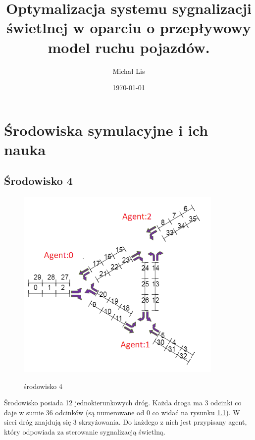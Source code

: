 \documentclass[12pt]{book}
\theoremstyle{plain}
\begin{document}
	\title{Optymalizacja  systemu sygnalizacji świetlnej w 
		oparciu o przepływowy model ruchu pojazdów.}
	\author{Michał Lis}
	\date{\today}
	\maketitle
	\tableofcontents
	
	\chapter {Środowiska symulacyjne i ich nauka}
	\section{Środowisko 4}
	\begin{figure}[H]
		\centering
		\includegraphics[width=10cm]{env_4_agenci}
		\label{fig:env_4_agenci}
		\caption{środowisko 4}
	\end{figure}
	
	Środowisko posiada 12 jednokierunkowych dróg. Każda droga ma 3 odcinki co daje w sumie 36 odcinków (są numerowane od 0 co widać na rysunku \ref{fig:env_4_agenci}).
	W sieci dróg znajdują się 3 skrzyżowania. Do każdego z nich jest przypisany agent, który odpowiada za sterowanie sygnalizacją świetlną.
	
\end{document}
